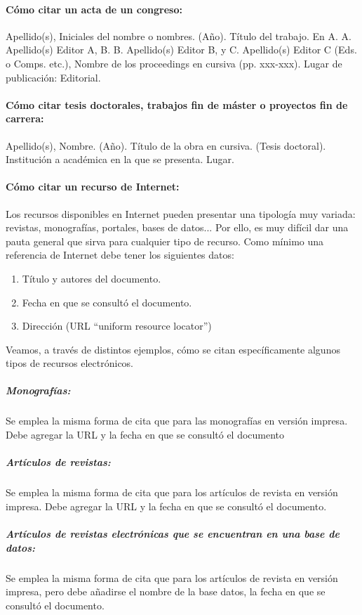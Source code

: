 \paragraph{Cómo citar un acta de un congreso:}
Apellido(s), Iniciales del nombre o nombres. (Año). Título del trabajo. En A. A. Apellido(s) Editor A, B. B. Apellido(s) Editor B, y C. Apellido(s) Editor C (Eds. o Comps. etc.), Nombre de los proceedings en cursiva (pp. xxx-xxx). Lugar de publicación: Editorial.

\paragraph{Cómo citar tesis doctorales, trabajos fin de máster o proyectos fin de carrera:}
Apellido(s), Nombre. (Año). Título de la obra en cursiva. (Tesis doctoral). Institución a académica en la que se presenta. Lugar.

\paragraph{Cómo citar un recurso de Internet:}
Los recursos disponibles en Internet pueden presentar una tipología muy variada: revistas, monografías, portales, bases de datos... Por ello, es muy difícil dar una pauta general que sirva para cualquier tipo de recurso.
Como mínimo una referencia de Internet debe tener los siguientes datos:
\begin{enumerate}
\item Título y autores del documento.
\item Fecha en que se consultó el documento.
\item Dirección (URL “uniform resource locator”)
\end{enumerate}

Veamos, a través de distintos ejemplos, cómo se citan específicamente algunos tipos de recursos electrónicos.

\subparagraph{Monografías:}

Se emplea la misma forma de cita que para las monografías en versión impresa. Debe agregar la URL y la fecha en que se consultó el documento

\subparagraph{Artículos de revistas:}
Se emplea la misma forma de cita que para los artículos de revista en versión impresa. Debe agregar la URL y la fecha en que se consultó el documento.

\subparagraph{Artículos de revistas electrónicas que se encuentran en una base de datos:}
Se emplea la misma forma de cita que para los artículos de revista en versión impresa, pero debe añadirse el nombre de la base datos, la fecha en que se consultó el documento.